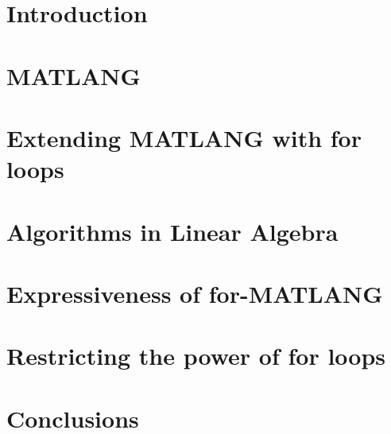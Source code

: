 \documentclass[acmsmall,review]{acmart}
\begin{document}
 




\maketitle

\section{Introduction}



\section{MATLANG}\label{sec:matlang}


\section{Extending MATLANG with for loops}\label{sec:formatlang}



%

\section{Algorithms in Linear Algebra}\label{sec:queries}


\section{Expressiveness of for-MATLANG}\label{sec:circuits}



\section{Restricting the power of for loops}\label{sec:restrict}


\section{Conclusions}\label{sec:conclude}

\end{document}
